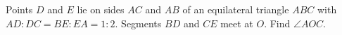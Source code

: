Points $D$ and $E$ lie on sides $AC$ and $AB$ of an equilateral triangle $ABC$ with $AD:DC=BE:EA=1:2$. Segments $BD$ and $CE$ meet at $O$. Find $\angle AOC$.
